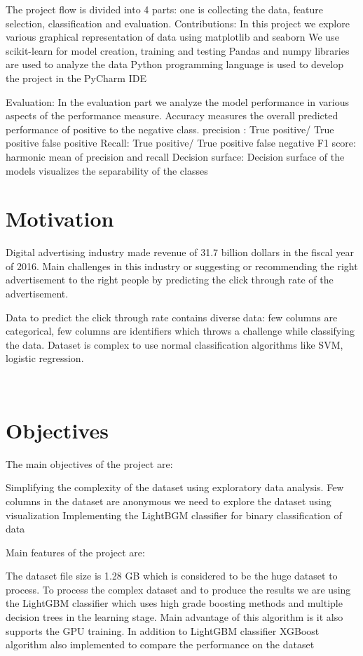 \documentclass[conference]{IEEEtran}
\begin{document}
The project flow is divided into 4 parts: one is collecting the data, feature selection, classification and evaluation.
Contributions:
In this project we explore  various graphical representation of data using matplotlib and seaborn
We use scikit-learn for model creation, training and testing
Pandas and numpy libraries are used to analyze the data
Python programming language is used to develop the project in the PyCharm IDE

Evaluation:
In the evaluation part we analyze the model performance in various aspects of the performance measure. Accuracy measures the overall predicted performance of positive to the negative class.
precision : True positive/ True positive false positive
Recall: True positive/ True positive false negative
F1 score: harmonic mean of precision and recall
Decision surface:
Decision surface of the models visualizes the separability of the classes






\section{Motivation}
Digital advertising  industry made  revenue of 31.7 billion dollars in  the fiscal year of 2016. Main challenges in this industry or suggesting or recommending the right advertisement to the right people by predicting the click through rate of the advertisement.

Data to predict the click through rate contains diverse data: few columns are categorical, few columns are identifiers which throws a challenge while classifying the data. Dataset is complex to use normal classification algorithms like SVM, logistic regression.



\\

\section{Objectives}
The main objectives of the project are:

Simplifying the complexity of the dataset using exploratory data analysis. Few columns in the dataset are anonymous we need to explore the dataset using visualization 
Implementing the LightBGM classifier for binary classification of data

Main features of the project are:

The dataset file size is 1.28 GB  which is considered to be the huge dataset to process. To process the complex dataset and to produce the results we are using the LightGBM classifier which uses high grade boosting methods and multiple decision trees in the learning stage. Main advantage of this algorithm is it also supports the GPU training.
In addition to LightGBM classifier XGBoost algorithm also implemented to compare the performance on the dataset
\end{document}
